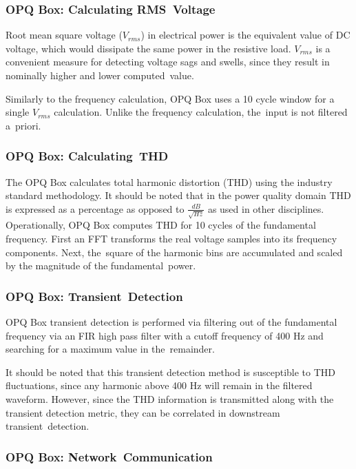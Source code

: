 \documentclass[energies,article,accept,moreauthors,pdftex]{Definitions/mdpi}
\begin{document}
\subsubsection{OPQ Box: Calculating RMS~Voltage}\label{subsec:root-mean-square-voltage}

Root mean square voltage ($V_{rms}$) in electrical power is the equivalent value of DC voltage, which would dissipate the same power in the resistive load. $V_{rms}$ is a convenient measure for detecting voltage sags and swells, since they result in nominally higher and lower computed~value.

Similarly to the frequency calculation, OPQ Box uses a 10 cycle window for a single $V_{rms}$ calculation. Unlike the frequency calculation, the~input is not filtered a~priori.

\subsubsection{OPQ Box: Calculating~THD}\label{subsec:thd}

The OPQ Box calculates total harmonic distortion (THD) using the industry standard methodology.
It should be noted that in the power quality domain THD is expressed as a percentage as opposed to $\frac{dB}{\sqrt{Hz}}$ as used in other disciplines.
Operationally, OPQ Box computes THD for 10 cycles of the fundamental frequency.
First an FFT transforms the real voltage samples into its frequency components.
Next, the~square of the harmonic bins are accumulated and scaled by the magnitude of the fundamental~power.

\subsubsection{OPQ Box: Transient~Detection}\label{subsec:transient-detection}

OPQ Box transient detection is performed via filtering out of the fundamental frequency via an FIR high pass filter with a cutoff frequency of 400 Hz and searching for a maximum value in the~remainder.

It should be noted that this transient detection method is susceptible to THD fluctuations, since any harmonic above 400 Hz will remain in the filtered waveform.
However, since the THD information is transmitted along with the transient detection metric, they can be correlated in downstream transient~detection.

\subsubsection{OPQ Box: Network~Communication}\label{subsec:network-communication}
\end{document}
